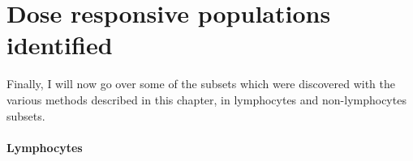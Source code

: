 


\section{Dose responsive populations identified}

Finally, I will now go over some of the subsets which were discovered with the various methods described in this chapter, in lymphocytes and non-lymphocytes subsets.

\paragraph{Lymphocytes}

